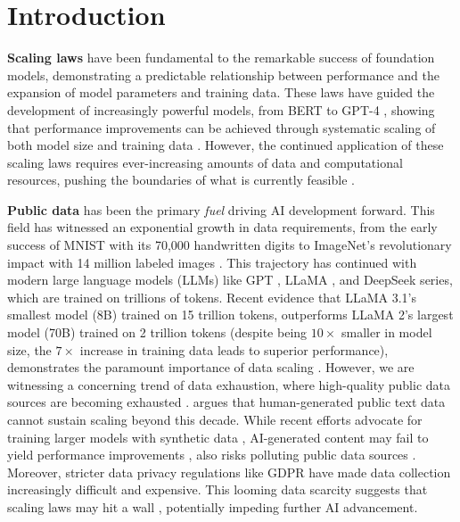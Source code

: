 \section{Introduction}

\textbf{Scaling laws} \citep{kaplan2020scaling,hoffmann2022training} have been fundamental to the remarkable success of foundation models, demonstrating a predictable relationship between performance and the expansion of model parameters and training data. These laws have guided the development of increasingly powerful models, from BERT \citep{devlin2018bert} to GPT-4 \citep{openai2023gpt4}, showing that performance improvements can be achieved through systematic scaling of both model size and training data \citep{brown2020language,chowdhery2022palm}. However, the continued application of these scaling laws requires ever-increasing amounts of data and computational resources, pushing the boundaries of what is currently feasible \citep{patterson2021carbon}. 



\textbf{Public data} has been the primary \textit{fuel} driving AI development forward. 
This field has witnessed an exponential growth in data requirements, from the early success of MNIST \citep{lecun1998mnist} with its 70,000 handwritten digits to ImageNet's revolutionary impact with 14 million labeled images \citep{deng2009imagenet}. 
This trajectory has continued with modern large language models (LLMs) like GPT \citep{openai2023gpt4}, LLaMA \citep{touvron2023llama3}, and DeepSeek \citep{liu2024deepseek} series, which are trained on trillions of tokens.
Recent evidence that LLaMA 3.1's smallest model (8B) \citep{meta2024llama3.1} trained on 15 trillion tokens, outperforms LLaMA 2's largest model (70B) \citep{touvron2023llama} trained on 2 trillion tokens (despite being $10 \times$ smaller in model size, the $7 \times$ increase in training data leads to superior performance), demonstrates the paramount importance of data scaling \citep{raffel2020exploring,deeplearningai2024federated}. 
However, we are witnessing a concerning trend of data exhaustion, where high-quality public data sources are becoming exhausted \citep{lee2021dedup}. \cite{villalobos2024position} argues that human-generated public text data cannot sustain scaling beyond this decade. 
While recent efforts advocate for training larger models with synthetic data \citep{chen2024diversity}, AI-generated content may fail to yield performance improvements \citep{wenger2024ai}, also risks polluting public data sources \citep{fang2024bias}. 
Moreover, stricter data privacy regulations like GDPR \citep{regulation2018general} have made data collection increasingly difficult and expensive.
This looming data scarcity suggests that scaling laws may hit a wall \citep{hardy2024wall}, potentially impeding further AI advancement.





